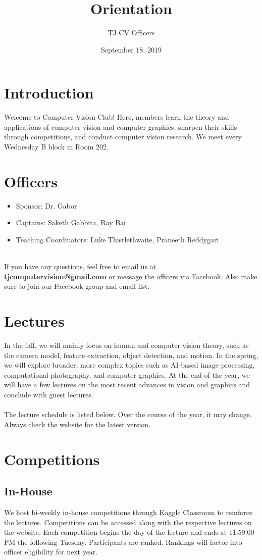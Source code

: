 \documentclass{article}
\title{Orientation}
\author{TJ CV Officers }
\date{September 18, 2019}
\begin{document}
\maketitle

\section{Introduction}
Welcome to Computer Vision Club! Here, members learn the theory and applications of computer vision and computer graphics, sharpen their skills through competitions, and conduct computer vision research. We meet every Wednesday B block in Room 202. 

\section{Officers}
\begin{itemize}
    \item Sponsor: Dr. Gabor
    \item Captains: Saketh Gabbita, Ray Bai
    \item Teaching Coordinators: Luke Thistlethwaite, Praneeth Reddygari
\end{itemize}
\\
If you have any questions, feel free to email us at \textbf{tjcomputervision@gmail.com} or message the officers via Facebook. Also make sure to join our Facebook group and email list. 

\section{Lectures}
In the fall, we will mainly focus on human and computer vision theory, such as the camera model, feature extraction, object detection, and motion. In the spring, we will explore broader, more complex topics such as AI-based image processing, computational photography, and computer graphics. At the end of the year, we will have a few lectures on the most recent advances in vision and graphics and conclude with guest lectures. \\ \\
The lecture schedule is listed below. Over the course of the year, it may change. Always check the website for the latest version. 

\section{Competitions}
\subsection{In-House}
We host bi-weekly in-house competitions through Kaggle Classroom to reinforce the lectures. Competitions can be accessed along with the respective lectures on the website. Each competition begins the day of the lecture and ends at 11:59:00 PM the following Tuesday. Participants are ranked. Rankings will factor into officer eligibility for next year.  
\end{document}
